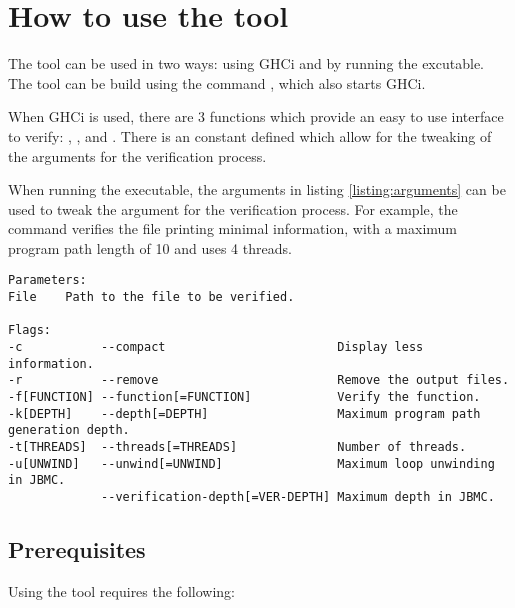 \chapter{How to use the tool} \label{chap:usage}
The tool can be used in two ways: using GHCi and by running the excutable. The tool
can be build using the command , which also starts GHCi.

When GHCi is used, there are 3 functions which provide an easy to use interface
to verify: , , and
. There is an 
constant defined which allow for the tweaking of the arguments for the verification
process.

When running the executable, the arguments in listing \ref{listing:arguments} 
can be used to tweak the argument for the verification process. For example,
the command  verifies the file
 printing minimal information, with a maximum
program path length of 10 and uses 4 threads.

\begin{lstlisting}[basicstyle=\small\ttfamily, caption={Argument for the executable}, label={listing:arguments}]
Parameters:
File    Path to the file to be verified.

Flags:
-c           --compact                        Display less information.
-r           --remove                         Remove the output files.
-f[FUNCTION] --function[=FUNCTION]            Verify the function.
-k[DEPTH]    --depth[=DEPTH]                  Maximum program path generation depth.
-t[THREADS]  --threads[=THREADS]              Number of threads.
-u[UNWIND]   --unwind[=UNWIND]                Maximum loop unwinding in JBMC.
             --verification-depth[=VER-DEPTH] Maximum depth in JBMC.
\end{lstlisting}

\section{Prerequisites}
Using the tool requires the following:

